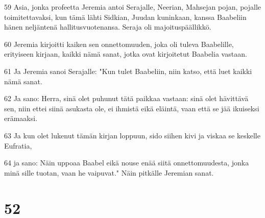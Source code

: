 \par 59 Asia, jonka profeetta Jeremia antoi Serajalle, Neerian, Mahsejan pojan, pojalle toimitettavaksi, kun tämä lähti Sidkian, Juudan kuninkaan, kanssa Baabeliin hänen neljäntenä hallitusvuotenansa. Seraja oli majoituspäällikkö.
\par 60 Jeremia kirjoitti kaiken sen onnettomuuden, joka oli tuleva Baabelille, erityiseen kirjaan, kaikki nämä sanat, jotka ovat kirjoitetut Baabelia vastaan.
\par 61 Ja Jeremia sanoi Serajalle: "Kun tulet Baabeliin, niin katso, että luet kaikki nämä sanat.
\par 62 Ja sano: Herra, sinä olet puhunut tätä paikkaa vastaan: sinä olet hävittävä sen, niin ettei siinä asukasta ole, ei ihmistä eikä eläintä, vaan että se jää ikuiseksi erämaaksi.
\par 63 Ja kun olet lukenut tämän kirjan loppuun, sido siihen kivi ja viskaa se keskelle Eufratia,
\par 64 ja sano: Näin uppoaa Baabel eikä nouse enää siitä onnettomuudesta, jonka minä sille tuotan, vaan he vaipuvat." Näin pitkälle Jeremian sanat.

\chapter{52}

